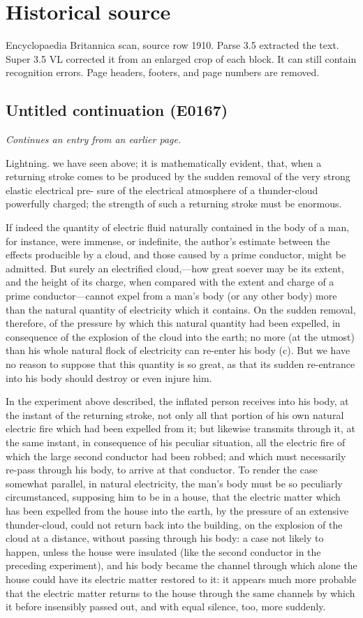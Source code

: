 \documentclass{article}
\begin{document}
\section*{Historical source}
Encyclopaedia Britannica scan, source row 1910. Parse 3.5 extracted the text. Super 3.5 VL corrected it from an enlarged crop of each block. It can still contain recognition errors.
Page headers, footers, and page numbers are removed.

\subsection*{Untitled continuation (E0167)}
\textit{Continues an entry from an earlier page.}

Lightning. we have seen above; it is mathematically evident, that, when a returning stroke comes to be produced by the sudden removal of the very strong elastic electrical pre- sure of the electrical atmosphere of a thunder-cloud powerfully charged; the strength of such a returning stroke must be enormous.

If indeed the quantity of electric fluid naturally contained in the body of a man, for instance, were immense, or indefinite, the author's estimate between the effects producible by a cloud, and those caused by a prime conductor, might be admitted. But surely an electrified cloud,—how great soever may be its extent, and the height of its charge, when compared with the extent and charge of a prime conductor—cannot expel from a man's body (or any other body) more than the natural quantity of electricity which it contains. On the sudden removal, therefore, of the pressure by which this natural quantity had been expelled, in consequence of the explosion of the cloud into the earth; no more (at the utmost) than his whole natural flock of electricity can re-enter his body (c). But we have no reason to suppose that this quantity is so great, as that its sudden re-entrance into his body should destroy or even injure him.

In the experiment above described, the inflated person receives into his body, at the instant of the returning stroke, not only all that portion of his own natural electric fire which had been expelled from it; but likewise transmits through it, at the same instant, in consequence of his peculiar situation, all the electric fire of which the large second conductor had been robbed; and which must necessarily re-pass through his body, to arrive at that conductor. To render the case somewhat parallel, in natural electricity, the man's body must be so peculiarly circumstanced, supposing him to be in a house, that the electric matter which has been expelled from the house into the earth, by the pressure of an extensive thunder-cloud, could not return back into the building, on the explosion of the cloud at a distance, without passing through his body: a case not likely to happen, unless the house were insulated (like the second conductor in the preceding experiment), and his body became the channel through which alone the house could have its electric matter restored to it: it appears much more probable that the electric matter returns to the house through the same channels by which it before insensibly passed out, and with equal silence, too, more suddenly.
\end{document}
